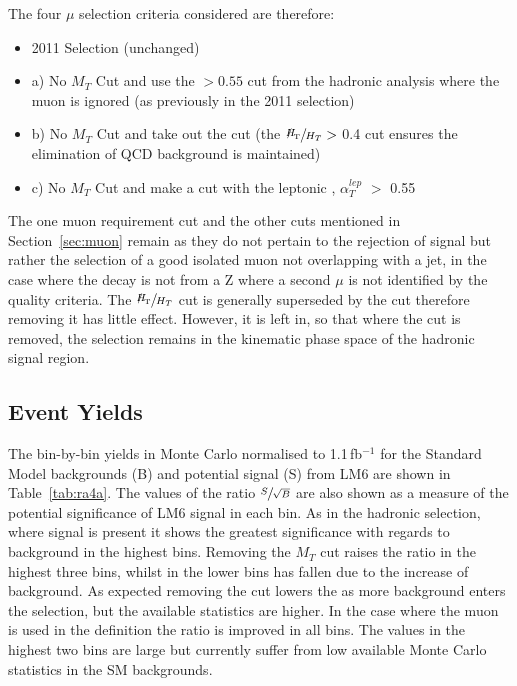 The four $\mu$ selection criteria considered are therefore:

\begin{itemize}
\item 2011 Selection (unchanged)
\item a) No $M_{T}$ Cut and use the \alt $> 0.55$ cut from the hadronic analysis where the muon is ignored (as previously in the 2011 selection)
\item b) No $M_{T}$ Cut and take out the \alt cut (the $\sfrac{\MHT}{\HT} >$ 0.4 cut ensures the elimination of QCD background is maintained)
\item c) No $M_{T}$ Cut and make a cut with the leptonic \alt, $\alpha^{lep}_{T}$ $>$ 0.55
\end{itemize}

The one muon requirement cut and the other cuts mentioned in Section~\ref{sec:muon} remain as they do not pertain to the rejection of signal but rather the selection of a good isolated muon not overlapping with a jet, in the case where the decay is not from a Z where a second $\mu$ is not identified by the quality criteria. The $\sfrac{\MHT}{\HT}$ cut is generally superseded by the \alt cut therefore removing it has little effect. However, it is left in, so that where the \alt cut is removed, the selection remains in the kinematic phase space of the hadronic signal region. 

\subsection{Event Yields}

The bin-by-bin yields in Monte Carlo normalised to 1.1\,fb$^{-1}$ for the Standard Model backgrounds (B) and potential signal (S) from LM6 are shown in Table~\ref{tab:ra4a}. The values of the ratio $\sfrac{S}{\sqrt{B}}$ are also shown as a measure of the potential significance of LM6 signal in each bin. As in the hadronic selection, where signal is present it shows the greatest significance with regards to background in the highest \HT bins. Removing the $M_{T}$ cut raises the ratio \srb in the highest three bins, whilst in the lower bins \srb has fallen due to the increase of background. As expected removing the \alt cut lowers the \srb as more background enters the selection, but the available statistics are higher. In the case where the muon is used in the \alt definition the ratio is improved in all bins. The values in the highest two bins are large but currently suffer from low available Monte Carlo statistics in the SM backgrounds. 

